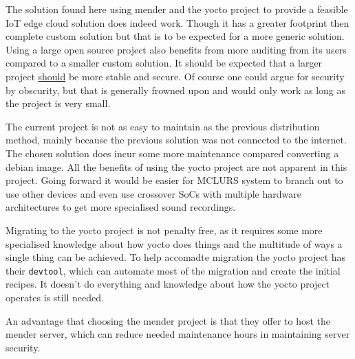 \documentclass[../../main.tex]{subfiles}
\begin{document}
The solution found here using mender and the yocto project to provide a feasible IoT edge cloud
solution does indeed work. Though it has a greater footprint then complete custom solution but that
is to be expected for a more generic solution. Using a large open source project  also benefits
from more auditing from its users compared to a smaller custom solution.
It should be expected that a larger project \underline{should} be more stable and secure.
Of course one could argue for security by obscurity, but that is generally frowned upon and would
only work as long as the project is very small.


The current project is not as easy to maintain as the previous distribution method, mainly
because the previous solution was not connected to the internet. The chosen solution does incur
some more maintenance compared converting a debian image.
All the benefits of using the yocto project are not apparent in this project. Going forward
it would be easier for MCLURS system to branch out to use other devices and even use crossover
SoCs with multiple hardware architectures to get more specialised sound recordings.


Migrating to the yocto project is not penalty free, as it requires some more specialised knowledge
about how yocto does things and the multitude of ways a single thing can be achieved.
To help accomadte migration the yocto project has their \texttt{devtool}, which can automate 
most of the migration and create the initial recipes. It doesn't do everything and knowledge about
how the yocto project operates is still needed.

An advantage that choosing the mender project is that they offer to host the mender server, which
can reduce needed maintenance hours in maintaining server security.
\end{document}
